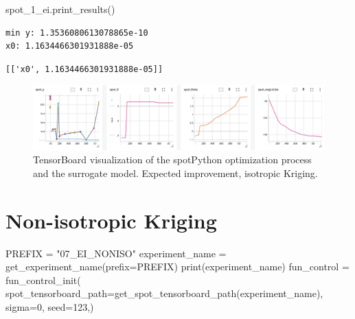 \documentclass[
  letterpaper,
  DIV=11,
  numbers=noendperiod]{scrreprt}
\newenvironment{Shaded}{\begin{snugshade}}{\end{snugshade}}
\newcommand{\BuiltInTok}[1]{\textcolor[rgb]{0.00,0.23,0.31}{#1}}
\newcommand{\DecValTok}[1]{\textcolor[rgb]{0.68,0.00,0.00}{#1}}
\newcommand{\NormalTok}[1]{\textcolor[rgb]{0.00,0.23,0.31}{#1}}
\newcommand{\OperatorTok}[1]{\textcolor[rgb]{0.37,0.37,0.37}{#1}}
\newcommand{\StringTok}[1]{\textcolor[rgb]{0.13,0.47,0.30}{#1}}
\begin{document}
\begin{Shaded}
\begin{Highlighting}[]
\NormalTok{spot\_1\_ei.print\_results()}
\end{Highlighting}
\end{Shaded}

\begin{verbatim}
min y: 1.3536080613078865e-10
x0: 1.1634466301931888e-05
\end{verbatim}

\begin{verbatim}
[['x0', 1.1634466301931888e-05]]
\end{verbatim}

\begin{figure}

{\centering \includegraphics[width=1\textwidth,height=\textheight]{figures_static/07_tensorboard_EI_ISO.png}

}

\caption{TensorBoard visualization of the spotPython optimization
process and the surrogate model. Expected improvement, isotropic
Kriging.}

\end{figure}

\hypertarget{non-isotropic-kriging}{%
\section{Non-isotropic Kriging}\label{non-isotropic-kriging}}

\begin{Shaded}
\begin{Highlighting}[]
\NormalTok{PREFIX }\OperatorTok{=} \StringTok{"07\_EI\_NONISO"}
\NormalTok{experiment\_name }\OperatorTok{=}\NormalTok{ get\_experiment\_name(prefix}\OperatorTok{=}\NormalTok{PREFIX)}
\BuiltInTok{print}\NormalTok{(experiment\_name)}
\NormalTok{fun\_control }\OperatorTok{=}\NormalTok{ fun\_control\_init(}
\NormalTok{    spot\_tensorboard\_path}\OperatorTok{=}\NormalTok{get\_spot\_tensorboard\_path(experiment\_name),}
\NormalTok{    sigma}\OperatorTok{=}\DecValTok{0}\NormalTok{,}
\NormalTok{    seed}\OperatorTok{=}\DecValTok{123}\NormalTok{,)}
\end{Highlighting}
\end{Shaded}
\end{document}
